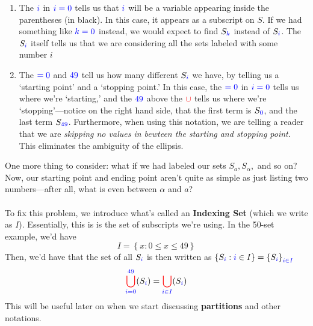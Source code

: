 \documentclass[10pt]{article}
\theoremstyle{definition}
\newcommand{\set}[1]{\left\{ #1 \right\}}
\begin{document}
\begin{enumerate}[label=\alph*)]
    \item The $\color{blue} i$ in $\color{blue}i=0$ tells us that $\color{blue}i$ will be a variable appearing inside the parentheses (in black).  In this case, it appears as a subscript on $S$.  If we had something like $\color{blue}k=0$ instead, we would expect to find $S_{\color{blue}k}$ instead of $S_{\color{blue}i}$.  The $S_{\color{blue} i}$ itself tells us that we are considering all the sets labeled with some number $i$
    \item The $\color{blue}=0$ and $\color{blue}49$ tell us how many different $S_{\color{blue}i}$ we have, by telling us a `starting point' and a `stopping point.'  In this case, the $\color{blue} =0$ in $\color{blue}i=0$ tells us where we're `starting,' and the $\color{blue}49$ above the $\textcolor{red}{\cup}$ tells us where we're `stopping'---notice on the right hand side, that the first term is $S_{\color{blue}0}$, and the last term $S_{\textcolor{blue}{49}}$.  Furthermore, when using this notation, we are telling a reader that we are \emph{skipping no values in bewteen the starting and stopping point}.  This eliminates the ambiguity of the ellipsis.
\end{enumerate}
One more thing to consider: what if we had labeled our sets $S_a, S_{\alpha},$ and so on?  Now, our starting point and ending point aren't quite as simple as just listing two numbers---after all, what is even between $\alpha$ and $a$?\\~\\
To fix this problem, we introduce what's called an \textbf{Indexing Set} (which we write as $I$).  Essentially, this is is the set of subscripts we're using.  In the 50-set example, we'd have
\[I = \set{x:0\leq x\leq49}\]
Then, we'd have that the set of all $S_{\color{blue}i}$ is then written as $\set{S_{\color{blue}i}:{\color{blue}i}\in I} = \set{S_{\color{blue}i}}_{\color{blue}i\in I}$
\[{\color{red}\bigcup^{{\color{blue}49}}_{\color{blue}i={0}}}(S_{\color{blue}i}) = {\color{red}\bigcup_{\color{blue}i\in I}}(S_{\color{blue}i})\]
This will be useful later on when we start discussing \textbf{partitions} and other notations.
\end{document}
